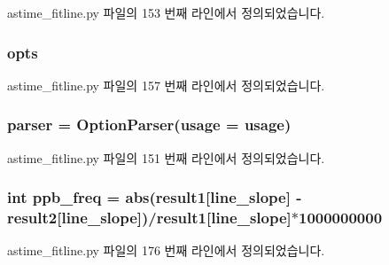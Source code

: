 astime\+\_\+fitline.\+py 파일의 153 번째 라인에서 정의되었습니다.

\subsubsection[{\texorpdfstring{opts}{opts}}]{\setlength{\rightskip}{0pt plus 5cm}opts}\hypertarget{namespaceastime__fitline_aa17b9f50d41f0a8e95659986136435dd}{}\label{namespaceastime__fitline_aa17b9f50d41f0a8e95659986136435dd}


astime\+\_\+fitline.\+py 파일의 157 번째 라인에서 정의되었습니다.

\subsubsection[{\texorpdfstring{parser}{parser}}]{\setlength{\rightskip}{0pt plus 5cm}parser = Option\+Parser({\bf usage} = {\bf usage})}\hypertarget{namespaceastime__fitline_a90eee7a4677ca8b1ed116364a24367f9}{}\label{namespaceastime__fitline_a90eee7a4677ca8b1ed116364a24367f9}


astime\+\_\+fitline.\+py 파일의 151 번째 라인에서 정의되었습니다.

\subsubsection[{\texorpdfstring{ppb\+\_\+freq}{ppb_freq}}]{\setlength{\rightskip}{0pt plus 5cm}int ppb\+\_\+freq = abs({\bf result1}\mbox{[}\textquotesingle{}line\+\_\+slope\textquotesingle{}\mbox{]} -\/ {\bf result2}\mbox{[}\textquotesingle{}line\+\_\+slope\textquotesingle{}\mbox{]})/{\bf result1}\mbox{[}\textquotesingle{}line\+\_\+slope\textquotesingle{}\mbox{]}$\ast$1000000000}\hypertarget{namespaceastime__fitline_a3fedec52db0923da2f5b1e4f3ce91eab}{}\label{namespaceastime__fitline_a3fedec52db0923da2f5b1e4f3ce91eab}


astime\+\_\+fitline.\+py 파일의 176 번째 라인에서 정의되었습니다.

